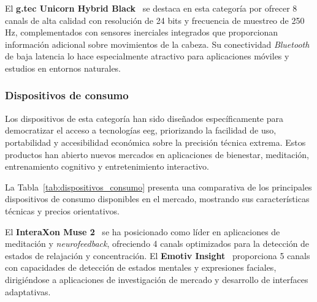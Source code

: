 El \textbf{g.tec Unicorn Hybrid Black}~\cite{gtec_unicorn,Pontifex2023} se destaca en esta categoría por ofrecer 8 \glspl{canal} de alta calidad con resolución de 24 bits y frecuencia de muestreo de 250 Hz, complementados con sensores inerciales integrados que proporcionan información adicional sobre movimientos de la cabeza. Su conectividad \textit{Bluetooth} de baja latencia lo hace especialmente atractivo para aplicaciones móviles y estudios en entornos naturales.

\subsubsection{Dispositivos de consumo}
\label{subsubsec:dispositivos_consumo}

Los dispositivos de esta categoría han sido diseñados específicamente para democratizar el acceso a tecnologías \acrshort{eeg}, priorizando la facilidad de uso, portabilidad y accesibilidad económica sobre la precisión técnica extrema. Estos productos han abierto nuevos mercados en aplicaciones de bienestar, meditación, entrenamiento cognitivo y entretenimiento interactivo.

La Tabla~\ref{tab:dispositivos_consumo} presenta una comparativa de los principales dispositivos de consumo disponibles en el mercado, mostrando sus características técnicas y precios orientativos.

\begin{table}[h!]
\centering
{}
\caption{Comparativa de dispositivos \acrshort{eeg} de consumo}
\label{tab:dispositivos_consumo}  
\end{table}

El \textbf{InteraXon Muse 2}~\cite{muse_2} se ha posicionado como líder en aplicaciones de meditación y \textit{neurofeedback}, ofreciendo 4 \glspl{canal} optimizados para la detección de estados de relajación y concentración. El \textbf{Emotiv Insight}~\cite{emotiv_insight} proporciona 5 \glspl{canal} con capacidades de detección de estados mentales y expresiones faciales, dirigiéndose a aplicaciones de investigación de mercado y desarrollo de interfaces adaptativas.

